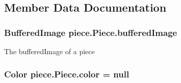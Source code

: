 \subsection{Member Data Documentation}
\hypertarget{classpiece_1_1Piece_a287a5ae3797417dbc7a04def1bb8ceda}{
\subsubsection[{buffered\-Image}]{\setlength{\rightskip}{0pt plus 5cm}Buffered\-Image piece.\-Piece.\-buffered\-Image\hspace{0.3cm}{\ttfamily [protected]}}}\label{classpiece_1_1Piece_a287a5ae3797417dbc7a04def1bb8ceda}
The buffered\-Image of a piece \hypertarget{classpiece_1_1Piece_a3b9829de5683f4c966f4a6c98ad77d65}{
\subsubsection[{color}]{\setlength{\rightskip}{0pt plus 5cm}Color piece.\-Piece.\-color = null\hspace{0.3cm}{\ttfamily [protected]}}}\label{classpiece_1_1Piece_a3b9829de5683f4c966f4a6c98ad77d65}

